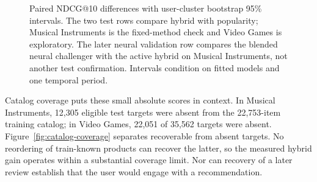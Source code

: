 \documentclass[11pt]{article}
\begin{document}
\begin{figure}[ht]
\centering
{}
\caption{Paired NDCG@10 differences with user-cluster bootstrap 95\% intervals. The two test rows compare hybrid with popularity; Musical Instruments is the fixed-method check and Video Games is exploratory. The later neural validation row compares the blended neural challenger with the active hybrid on Musical Instruments, not another test confirmation. Intervals condition on fitted models and one temporal period.}
\label{fig:paired-differences}
\end{figure}

Catalog coverage puts these small absolute scores in context. In Musical Instruments, 12,305 eligible test targets were absent from the 22,753-item training catalog; in Video Games, 22,051 of 35,562 targets were absent. Figure~\ref{fig:catalog-coverage} separates recoverable from absent targets. No reordering of train-known products can recover the latter, so the measured hybrid gain operates within a substantial coverage limit. Nor can recovery of a later review establish that the user would engage with a recommendation.
\end{document}
